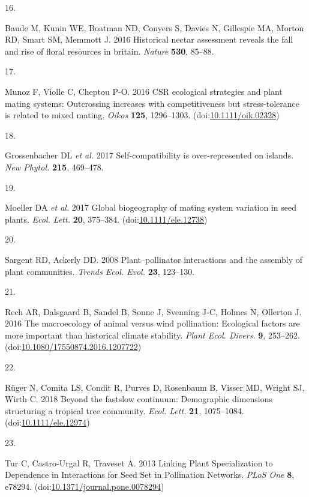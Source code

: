 \documentclass[
  12pt,
  a4paper,
]{article}
\newlength{\cslhangindent}
\newlength{\csllabelwidth}
\newlength{\cslentryspacingunit} %
\newenvironment{CSLReferences}[2] %
 {%
  \setlength{\parindent}{0pt}
  \ifodd #1
  \let\oldpar\par
  \def\par{\hangindent=\cslhangindent\oldpar}
  \fi
  \setlength{\parskip}{#2\cslentryspacingunit}
 }%
 {}
\newcommand{\CSLLeftMargin}[1]{\parbox[t]{\csllabelwidth}{#1}}
\newcommand{\CSLRightInline}[1]{\parbox[t]{\linewidth - \csllabelwidth}{#1}\break}
\begin{document}
\begin{CSLReferences}{0}{0}
\leavevmode{}%
\CSLLeftMargin{16. }
\CSLRightInline{Baude M, Kunin WE, Boatman ND, Conyers S, Davies N, Gillespie MA, Morton RD, Smart SM, Memmott J. 2016 Historical nectar assessment reveals the fall and rise of floral resources in britain. \emph{Nature} \textbf{530}, 85--88.}

\leavevmode{}%
\CSLLeftMargin{17. }
\CSLRightInline{Munoz F, Violle C, Cheptou P-O. 2016 {CSR} ecological strategies and plant mating systems: Outcrossing increases with competitiveness but stress-tolerance is related to mixed mating. \emph{Oikos} \textbf{125}, 1296--1303. (doi:\href{https://doi.org/10.1111/oik.02328}{10.1111/oik.02328})}

\leavevmode{}%
\CSLLeftMargin{18. }
\CSLRightInline{Grossenbacher DL \emph{et al.} 2017 Self-compatibility is over-represented on islands. \emph{New Phytol.} \textbf{215}, 469--478.}

\leavevmode{}%
\CSLLeftMargin{19. }
\CSLRightInline{Moeller DA \emph{et al.} 2017 Global biogeography of mating system variation in seed plants. \emph{Ecol. Lett.} \textbf{20}, 375--384. (doi:\href{https://doi.org/10.1111/ele.12738}{10.1111/ele.12738})}

\leavevmode{}%
\CSLLeftMargin{20. }
\CSLRightInline{Sargent RD, Ackerly DD. 2008 Plant--pollinator interactions and the assembly of plant communities. \emph{Trends Ecol. Evol.} \textbf{23}, 123--130.}

\leavevmode{}%
\CSLLeftMargin{21. }
\CSLRightInline{Rech AR, Dalsgaard B, Sandel B, Sonne J, Svenning J-C, Holmes N, Ollerton J. 2016 The macroecology of animal versus wind pollination: Ecological factors are more important than historical climate stability. \emph{Plant Ecol. Divers.} \textbf{9}, 253--262. (doi:\href{https://doi.org/10.1080/17550874.2016.1207722}{10.1080/17550874.2016.1207722})}

\leavevmode{}%
\CSLLeftMargin{22. }
\CSLRightInline{Rüger N, Comita LS, Condit R, Purves D, Rosenbaum B, Visser MD, Wright SJ, Wirth C. 2018 Beyond the fast\textendash slow continuum: Demographic dimensions structuring a tropical tree community. \emph{Ecol. Lett.} \textbf{21}, 1075--1084. (doi:\href{https://doi.org/10.1111/ele.12974}{10.1111/ele.12974})}

\leavevmode{}%
\CSLLeftMargin{23. }
\CSLRightInline{Tur C, Castro-Urgal R, Traveset A. 2013 Linking {Plant Specialization} to {Dependence} in {Interactions} for {Seed Set} in {Pollination Networks}. \emph{PLoS One} \textbf{8}, e78294. (doi:\href{https://doi.org/10.1371/journal.pone.0078294}{10.1371/journal.pone.0078294})}


\end{CSLReferences}
\end{document}
